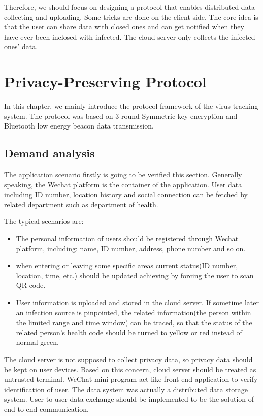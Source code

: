 \documentclass[11pt,en]{elegantpaper}
\begin{document}
Therefore, we should focus on designing a protocol that enables distributed data collecting and uploading. Some tricks are done on the client-side. The core idea is that the user can share data with closed ones and can get notified when they have ever been inclosed with infected. The cloud server only collects the infected ones' data.

\section{Privacy-Preserving Protocol}
In this chapter, we mainly introduce the protocol framework of the virus tracking system. The protocol was based on 3 round Symmetric-key encryption and Bluetooth low energy beacon data transmission. 

\subsection{Demand analysis}
The application scenario firstly is going to be verified this section. Generally speaking, the Wechat platform is the container of the application. User data including ID number, location history and social connection can be fetched by related department such as department of health.

The typical scenarios are:
\begin{itemize}
	\item The personal information of users should be registered through Wechat platform, including: name, ID number, address, phone number and so on.
	\item when entering or leaving some specific areas current status(ID number, location, time, etc.) should be updated achieving by forcing the user to scan QR code.
	\item User information is uploaded and stored in the cloud server. If sometime later an infection source is pinpointed, the related information(the person within the limited range and time window) can be traced, so that the status of the related person’s health code should be turned to yellow or red instead of normal green.
\end{itemize}

The cloud server is not supposed to collect privacy data, so privacy data should be kept on user devices. Based on this concern, cloud server should be treated as untrusted terminal\cite{berke2020assessing}. WeChat mini program act like front-end application to verify identification of user. The data system was actually a distributed data storage system. User-to-user data exchange should be implemented to be the solution of end to end communication.
\end{document}
